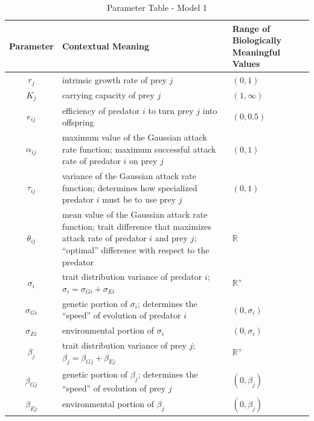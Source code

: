 \documentclass{amsart}
\theoremstyle{definition}
\theoremstyle{remark}
\numberwithin{equation}{section}
\begin{document}
\begin{table}
	\label{parameter_table_model_1}
	\caption{Parameter Table - Model 1}
    \begin{tabular}{||c|L{7cm}|L{2.5cm}||}\hline\hline
    {\bf Parameter} & {\bf Contextual Meaning} & {\bf Range of Biologically Meaningful Values} \\\hline\hline
    $r_j$ & intrinsic growth rate of prey $j$ & $(0, 1)$ \\\hline
    $K_j$ & carrying capacity of prey $j$ & $(1, \infty)$ \\\hline\hline
    $e_{ij}$ & efficiency of predator $i$ to turn prey $j$ into offspring & $(0, 0.5)$ \\\hline\hline
    $\alpha_{ij}$ & maximum value of the Gaussian attack rate function; maximum successful attack rate of predator $i$ on prey $j$ & $(0, 1)$ \\\hline
    $\tau_{ij}$   & variance of the Gaussian attack rate function; determines how specialized predator $i$ must be to use prey $j$ & $(0, 1)$ \\\hline
    $\theta_{ij}$ & mean value of the Gaussian attack rate function; trait difference that maximizes attack rate of predator $i$ and prey $j$; ``optimal'' difference with respect to the predator & $\mathbb{R}$ \\\hline\hline
    $\sigma_i$ & trait distribution variance of predator $i$; $\sigma_i = \sigma_{Gi} + \sigma_{Ei}$ & $\mathbb{R}^{+}$ \\\hline
    $\sigma_{Gi}$ & genetic portion of $\sigma_i$; determines the ``speed'' of evolution of predator $i$ & $(0, \sigma_i)$ \\\hline
    $\sigma_{Ei}$ & environmental portion of $\sigma_i$ & $(0, \sigma_i)$ \\\hline\hline
    $\beta_j$ & trait distribution variance of prey $j$; $\beta_j = \beta_{Gj} + \beta_{Ej}$ & $\mathbb{R}^{+}$ \\\hline
    $\beta_{Gj}$ & genetic portion of $\beta_j$; determines the ``speed'' of evolution of prey $j$ & $(0, \beta_j)$ \\\hline
    $\beta_{Ej}$ & environmental portion of $\beta_j$ & $(0, \beta_j)$ \\\hline\hline
    \end{tabular}
\end{table}
\end{document}
